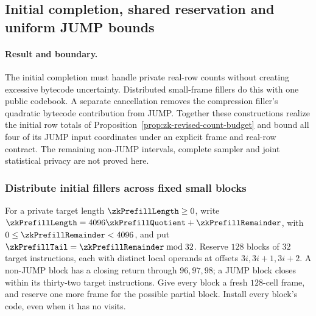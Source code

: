 \subsection{Initial completion, shared reservation and uniform JUMP bounds}\label{note:zk-count-prefill}

\paragraph{Result and boundary.} The initial completion must handle private real-row counts without creating excessive bytecode uncertainty. Distributed small-frame fillers do this with one public codebook. A separate cancellation removes the compression filler's quadratic bytecode contribution from JUMP. Together these constructions realize the initial row totals of Proposition~\ref{prop:zk-revised-count-budget} and bound all four of its JUMP input coordinates under an explicit frame and real-row contract. The remaining non-JUMP intervals, complete sampler and joint statistical privacy are not proved here.

\subsubsection{Distribute initial fillers across fixed small blocks}

For a private target length $\zkPrefillLength\ge0$, write $\zkPrefillLength=4096\zkPrefillQuotient+\zkPrefillRemainder$, with $0\le\zkPrefillRemainder<4096$, and put $\zkPrefillTail=\zkPrefillRemainder\bmod32$. Reserve $128$ blocks of $32$ target instructions, each with distinct local operands at offsets $3i,3i+1,3i+2$. A non-JUMP block has a closing return through $96,97,98$; a JUMP block closes within its thirty-two target instructions. Give every block a fresh $128$-cell frame, and reserve one more frame for the possible partial block. Install every block's code, even when it has no visits.

